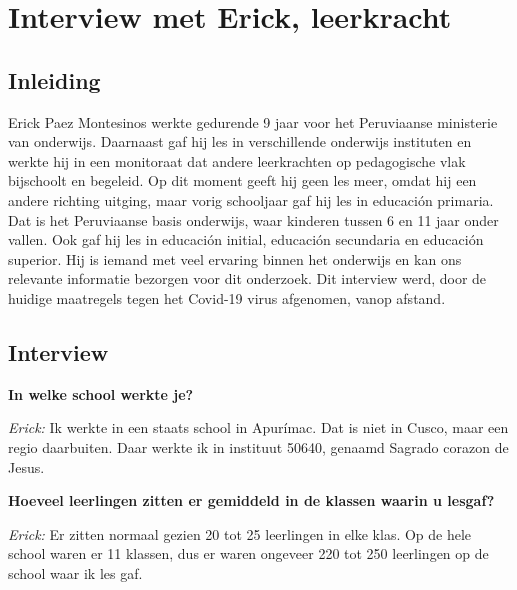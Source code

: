 \chapter{Interview met Erick, leerkracht}
\label{ch:interviewErick}

\section{Inleiding}
Erick Paez Montesinos werkte gedurende 9 jaar voor het Peruviaanse ministerie van onderwijs. Daarnaast gaf hij les in verschillende onderwijs instituten en werkte hij in een monitoraat dat andere leerkrachten op pedagogische vlak bijschoolt en begeleid. Op dit moment geeft hij geen les meer, omdat hij een andere richting uitging, maar vorig schooljaar gaf hij les in educación primaria. Dat is het Peruviaanse basis onderwijs, waar kinderen tussen 6 en 11 jaar onder vallen. \autocite{Nuffic2015} Ook gaf hij les in educación initial, educación secundaria en educación superior. Hij is iemand met veel ervaring binnen het onderwijs en kan ons relevante informatie bezorgen voor dit onderzoek. Dit interview werd, door de huidige maatregels tegen het Covid-19 virus afgenomen, vanop afstand.


\section{Interview}

\textbf{In welke school werkte je?}

\textit{Erick:} Ik werkte in een staats school in Apurímac. Dat is niet in Cusco, maar een regio daarbuiten. Daar werkte ik in instituut 50640, genaamd Sagrado corazon de Jesus.

\textbf{Hoeveel leerlingen zitten er gemiddeld in de klassen waarin u lesgaf?}

\textit{Erick:} Er zitten normaal gezien 20 tot 25 leerlingen in elke klas. Op de hele school waren er 11 klassen, dus er waren ongeveer 220 tot 250 leerlingen op de school waar ik les gaf. %

